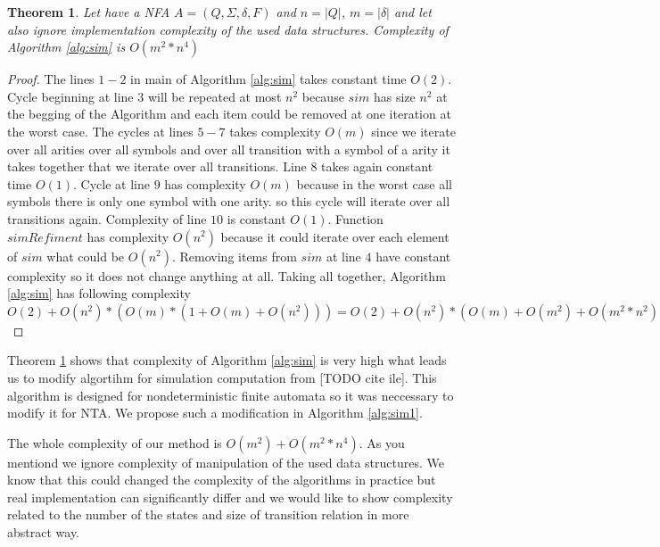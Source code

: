 \documentclass[a4paper, 12pt]{article}
\newtheorem{theorem}{Theorem}
\begin{document}
\begin{theorem}
	\label{the:nfacompl}
Let have a NFA $A = (Q, \Sigma, \delta, F)$ and $n = |Q|$, $m = |\delta|$ and let also ignore implementation
complexity of the used data structures.
Complexity of Algorithm \ref{alg:sim} is $O(m^2*n^4)$
\end{theorem}

\begin{proof}
	The lines $1-2$ in main of Algorithm \ref{alg:sim} takes constant time $O(2)$.
	Cycle beginning at line $3$ will be repeated at most $n^2$ because $sim$ has size $n^2$ at the begging of the Algorithm
	and each item could be removed at one iteration at the worst case.
	The cycles at lines $5-7$ takes complexity $O(m)$ since we iterate over all arities over all symbols and over all transition
	with a symbol of a arity it takes together that we iterate over all transitions.
	Line $8$ takes again constant time $O(1)$.
	Cycle at line $9$ has complexity $O(m)$ because in the worst case all symbols there is only one symbol with one arity.
	so this cycle will iterate over all transitions again.
	Complexity of line $10$ is constant $O(1)$.
	Function $simRefiment$ has complexity $O(n^2)$ because it could iterate over each element of $sim$ what could be $O(n^2)$.
	Removing items from $sim$ at line $4$ have constant complexity so it does not change anything at all.
	Taking all together, Algorithm \ref{alg:sim} has following complexity 
	$O(2) + O(n^2)*(O(m)*(1+O(m)+O(n^2)))=
	O(2) + O(n^2)*(O(m)+O(m^2)+O(m^2*n^2)) =
	O(n^2)*(O(m^2*n^2)) =
	O(m^2*n^4)$
\end{proof}

Theorem \ref{the:nfacompl} shows that complexity of Algorithm \ref{alg:sim} is very high what leads us
to modify algortihm for simulation computation from [TODO cite ile].
This algorithm is designed for nondeterministic finite automata so it was neccessary to modify it for NTA.
We propose such a modification in Algorithm \ref{alg:sim1}.

\begin{algorithm}[h]
\label{alg:sim1}
	
	 \caption{Computing simulation on a NTA efficiently. Based on similiar algortihm for finite automata in \cite{ilie:nfa}.}
\end{algorithm}

The whole complexity of our method is $O(m^2)+O(m^2*n^4)$. As you mentiond we ignore complexity of
manipulation of the used data structures.
We know that this could changed the complexity of the algorithms in practice but real implementation can significantly differ
and we would like to show complexity related to the number of the states and size of transition relation in more abstract way.
\end{document}
